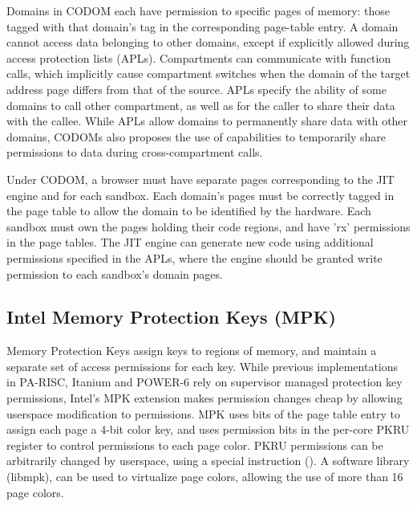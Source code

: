 Domains in CODOM each have permission to specific pages of memory: 
those tagged with that domain's tag in the corresponding page-table entry.
A domain cannot access data belonging to other domains, except if
explicitly allowed during access protection lists (APLs).
Compartments can communicate with function calls, which implicitly
cause compartment switches when the domain of the target address page
differs from that of the source.
APLs specify the ability of some domains to call other compartment,
as well as for the caller to share their data with the callee.
While APLs allow domains to permanently share data with other domains,
CODOMs also proposes the use of capabilities to temporarily share
permissions to data during cross-compartment calls.

Under CODOM, a browser must have separate pages corresponding to the
JIT engine and for each sandbox. 
Each domain's pages must be correctly tagged in the page table to allow
the domain to be identified by the hardware.
Each sandbox must own the pages holding their code regions, and have
'rx' permissions in the page tables. 
The JIT engine can generate new code using additional permissions specified
in the APLs, where the engine should be granted write permission to
each sandbox's domain pages.

\subsection{Intel Memory Protection Keys (MPK)}
Memory Protection Keys assign keys to regions of memory, and maintain
a separate set of access permissions for each key.
While previous implementations in PA-RISC, Itanium and POWER-6 rely on 
supervisor managed protection key permissions, Intel's MPK extension
makes permission changes cheap by allowing userspace modification to
permissions.
MPK uses bits of the page table entry to assign each page a 4-bit color key,
and uses permission bits in the per-core PKRU register to control permissions
to each page color.
PKRU permissions can be arbitrarily changed by userspace, using a special
instruction ().
A software library (libmpk), can be used to virtualize page colors, allowing
the use of more than 16 page colors.

